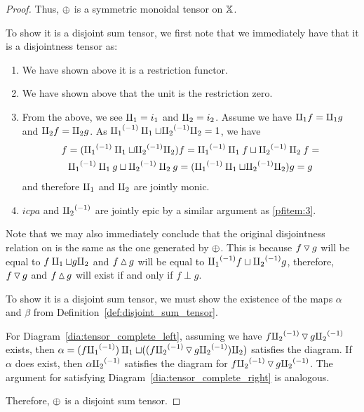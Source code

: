 \begin{proof}
  Thus, $\oplus$ is a symmetric monoidal tensor on $\mathbb{X}$.

  To show it is a disjoint sum tensor, we first note that we immediately have that it is a
  disjointness tensor as:
    \begin{enumerate}[{(}i{)}]
      \item We have shown above it is a restriction functor.
      \item We have shown above that the unit is the restriction zero.
      \item From the above, we see $\amalg_{1} = i_1$ and $\amalg_{2} = i_2$. Assume we have $\amalg_{1} f = \amalg_{1} g$
        and $\amalg_{2} f = \amalg_{2} g$. As ${\amalg_{1}}^{(-1)} \amalg_{1} \sqcup {\amalg_{2}}^{(-1)} \amalg_{2} = 1$, we have
        \begin{multline*}
           f = ({\amalg_{1}}^{(-1)} \amalg_{1} \sqcup {\amalg_{2}}^{(-1)} \amalg_{2}) f = {\amalg_{1}}^{(-1)} \amalg_{1} f \sqcup {\amalg_{2}}^{(-1)} \amalg_{2} f = \\
           {\amalg_{1}}^{(-1)} \amalg_{1} g \sqcup {\amalg_{2}}^{(-1)} \amalg_{2} g =  ({\amalg_{1}}^{(-1)} \amalg_{1} \sqcup {\amalg_{2}}^{(-1)} \amalg_{2}) g = g
        \end{multline*}
        and therefore $\amalg_{1}$ and $\amalg_{2}$ are jointly monic.\label{pfitem:3}
      \item $icpa$ and ${\amalg_{2}}^{(-1)}$ are jointly epic by a similar argument as \ref{pfitem:3}.
    \end{enumerate}

  Note that we may also immediately conclude that the original disjointness relation on \X is the
  same as the one generated by $\oplus$. This is because $f \operatorname{\triangledown} g$ will be equal to $f\amalg_{1} \sqcup
  g\amalg_{2}$ and $f \operatorname{\vartriangle} g$ will be equal to ${\amalg_{1}}^{(-1)} f \sqcup {\amalg_{2}}^{(-1)} g$, therefore, $f\operatorname{\triangledown} g$ and $f
  \operatorname{\vartriangle} g$ will exist if and only if $f\perp g$.

  To show it is a disjoint sum tensor, we must show the existence of the maps $\alpha$ and $\beta$
  from Definition~\ref{def:disjoint_sum_tensor}.

  For Diagram~\ref{dia:tensor_complete_left}, assuming we have $f{\amalg_{2}}^{(-1)} \operatorname{\triangledown} g{\amalg_{2}}^{(-1)}$ exists,
  then $\alpha = (f{\amalg_{1}}^{(-1)})\amalg_{1} \sqcup ((f{\amalg_{2}}^{(-1)} \operatorname{\triangledown} g {\amalg_{2}}^{(-1)})\amalg_{2})$ satisfies the diagram. If
  $\alpha$ does exist, then $\alpha {\amalg_{2}}^{(-1)}$ satisfies the diagram for $f{\amalg_{2}}^{(-1)} \operatorname{\triangledown} g{\amalg_{2}}^{(-1)}$. The
  argument for satisfying Diagram~\ref{dia:tensor_complete_right} is analogous.

  Therefore, $\oplus$ is a disjoint sum tensor.
\end{proof}



